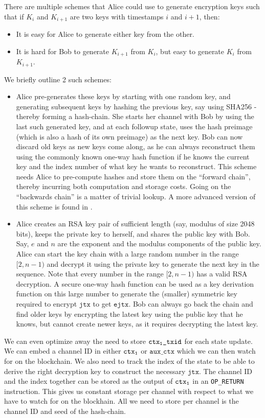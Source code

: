 There are multiple schemes that Alice could use to generate encryption keys such that if $K_i$ and $K_{i+1}$ are two keys with timestamps $\mathit{i}$ and $i+1$, then:
\begin{itemize}
\item It is easy for Alice to generate either key from the other.
\item It is hard for Bob to generate $K_{i+1}$ from $K_i$, but easy to generate $K_i$ from $K_{i+1}$. 
\end{itemize}
We briefly outline 2 such schemes:
\begin{itemize}
    \item Alice pre-generates these keys by starting with one random key, and generating subsequent keys by hashing the previous key, say using SHA256 - thereby forming a hash-chain. She starts her channel with Bob by using the last such generated key, and at each followup state, uses the hash preimage (which is also a hash of its own preimage) as the next key. Bob can now discard old keys as new keys come along, as he can always reconstruct them using the commonly known one-way hash function if he knows the current key and the index number of what key he wants to reconstruct. This scheme needs Alice to pre-compute hashes and store them on the ``forward chain'', thereby incurring both computation and storage costs. Going on the ``backwards chain'' is a matter of trivial lookup. A more advanced version of this scheme is found in \cite{shachain}.
    \item Alice creates an RSA key pair of sufficient length (say, modulus of size 2048 bits), keeps the private key to herself, and shares the public key with Bob. Say, $\mathit{e}$ and $\mathit{n}$ are the exponent and the modulus components of the public key. Alice can start the key chain with a large random number in the range $\mathit{[2, n-1)}$ and decrypt it using the private key to generate the next key in the sequence. Note that every number in the range $\mathit{[2, n-1)}$ has a valid RSA decryption. A secure one-way hash function can be used as a key derivation function on this large number to generate the (smaller) symmetric key required to encrypt $\texttt{jtx}$ to get $\texttt{ejtx}$. Bob can always go back the chain and find older keys by encrypting the latest key using the public key that he knows, but cannot create newer keys, as it requires decrypting the latest key.
\end{itemize}

We can even optimize away the need to store $\texttt{ctx\textsubscript{1}\_txid}$ for each state update. We can embed a channel ID in either $\texttt{ctx\textsubscript{1}}$ or $\texttt{aux\_ctx}$ which we can then watch for on the blockchain. We also need to track the index of the state to be able to derive the right decryption key to construct the necessary $\texttt{jtx}$. The channel ID and the index together can be stored as the  output of $\texttt{ctx\textsubscript{1}}$ in an \texttt{OP\_RETURN} instruction. This gives us constant storage per channel with respect to what we have to watch for on the blockhain. All we need to store per channel is the channel ID and seed of the hash-chain. 

